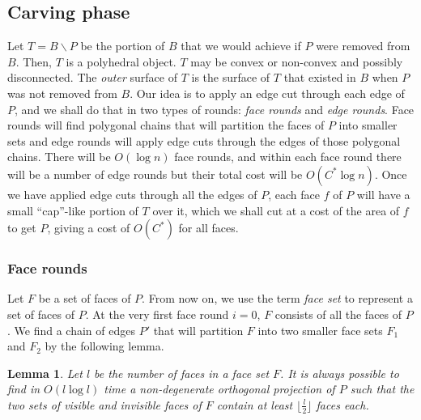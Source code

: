 \documentclass{llncs}
\newtheorem{lem}{Lemma}
\begin{document}
\subsection{Carving phase} 

Let $T=B\backslash P$ be the portion of $B$ that we would achieve if $P$ were removed from $B$.
Then, $T$ is a polyhedral object. $T$ may be convex or non-convex and possibly disconnected.
The \emph{outer} surface of $T$ is the surface of $T$ that existed in $B$ when $P$ was not removed from $B$.
Our idea is to apply an edge cut through each edge of $P$, 
and we shall do that in two types of rounds: \emph{face rounds} and \emph{edge rounds}.
Face rounds will find polygonal chains that will partition the faces of $P$  into smaller 
sets and edge rounds will apply edge cuts through the edges of those polygonal chains.
There will be $O(\log n)$ face rounds,
and within each face round there will be a number of edge rounds but their total cost will be $O(C^*\log n)$. 
Once we have applied edge cuts through all the edges of $P$, each face $f$ of $P$ will have a small ``cap''-like
portion of $T$ over it, which we shall cut at a cost of the area of $f$ to get $P$, 
giving a cost of $O(C^*)$ for all faces.

\subsubsection{Face rounds}
Let $F$ be a set of faces of $P$.
From now on, we use the term \emph{face set} to represent a set of faces of $P$.
At the very first face round $i=0$, $F$ consists of all the faces of $P$.
We find a chain of edges ${P'}$ that will partition $F$ into two smaller
face sets $F_1$ and $F_2$ by the following lemma.


\begin{lem}
\label{le:face_equal_partition}
Let $l$ be the number of faces in a face set $F$.
It is always possible to find in $O(l\log l)$ time a non-degenerate orthogonal projection of $P$ 
such that the two sets of visible and invisible faces of $F$ 
contain at least $\lfloor\frac{l}{2}\rfloor$ faces each.
\end{lem}
\end{document}
